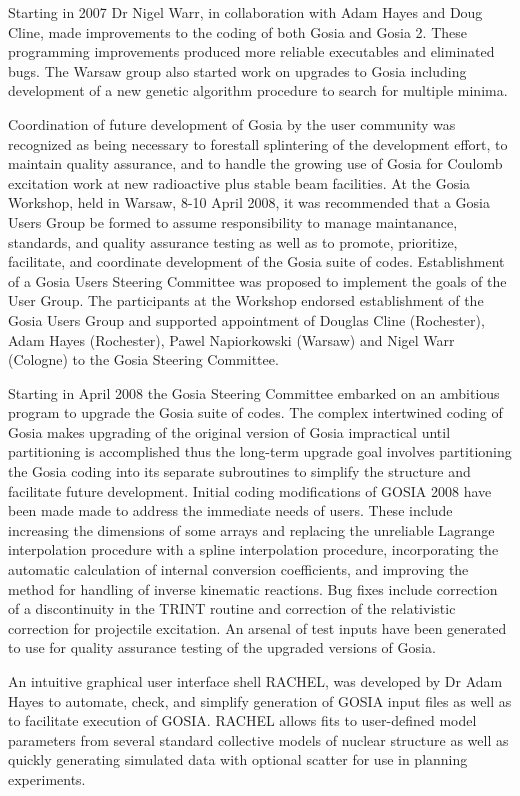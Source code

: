 \documentclass[10pt]{article}
\begin{document}
Starting in 2007 Dr Nigel Warr, in collaboration with Adam Hayes and Doug Cline, made improvements to the coding of both Gosia and Gosia 2. These programming improvements produced more reliable executables and eliminated bugs. The Warsaw group also started work on upgrades to Gosia including development of a new genetic algorithm procedure to search for multiple minima.

Coordination of future development of Gosia by the user community was recognized as being necessary to forestall splintering of the development effort, to maintain quality assurance, and to handle the growing use of Gosia for Coulomb excitation work at new radioactive plus stable beam facilities. At the Gosia Workshop, held in Warsaw, 8-10 April 2008, it was recommended that a Gosia Users Group be formed to assume responsibility to manage maintanance, standards, and quality assurance testing as well as to promote, prioritize, facilitate, and coordinate development of the Gosia suite of codes. Establishment of a Gosia Users Steering Committee was proposed to implement the goals of the User Group. The participants at the Workshop endorsed establishment of the Gosia Users Group and supported appointment of Douglas Cline (Rochester), Adam Hayes (Rochester), Pawel Napiorkowski (Warsaw) and Nigel Warr (Cologne) to the Gosia Steering Committee.

Starting in April 2008 the Gosia Steering Committee embarked on an ambitious program to upgrade the Gosia suite of codes. The complex intertwined coding of Gosia makes upgrading of the original version of Gosia impractical until partitioning is accomplished thus the long-term upgrade goal involves partitioning the Gosia coding into its separate subroutines to simplify the structure and facilitate future development. Initial coding modifications of GOSIA 2008 have been made made to address the immediate needs of users. These include increasing the dimensions of some arrays and replacing the unreliable Lagrange interpolation procedure with a spline interpolation procedure, incorporating the automatic calculation of internal conversion coefficients, and improving the method for handling of inverse kinematic reactions. Bug fixes include correction of a discontinuity in the TRINT routine and correction of the relativistic correction for projectile excitation. An arsenal of test inputs have been generated to use for quality assurance testing of the upgraded versions of Gosia.

An intuitive graphical user interface shell RACHEL, was developed by Dr Adam Hayes to automate, check, and simplify generation of GOSIA input files as well as to facilitate execution of GOSIA. RACHEL allows fits to user-defined model parameters from several standard collective models of nuclear structure as well as quickly generating simulated data with optional scatter for use in planning experiments.
\end{document}
